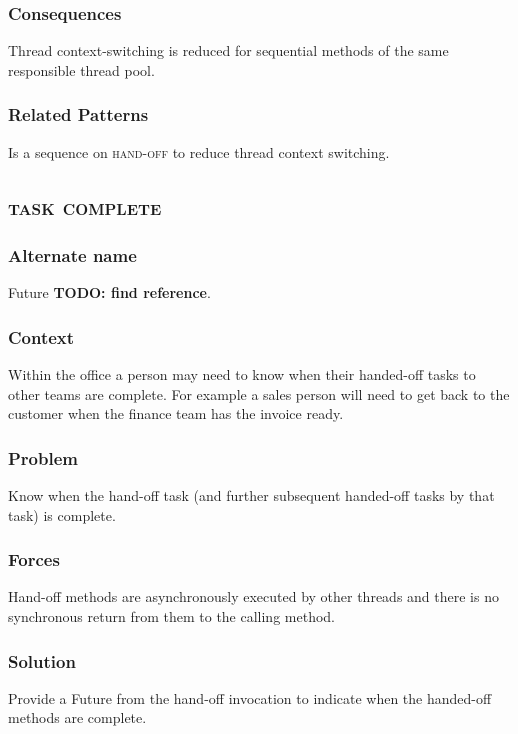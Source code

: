 \documentclass[prodmode]{style/acmlarge}
\begin{document}
\subsubsection*{Consequences} Thread context-switching is reduced for sequential
methods of the same responsible thread pool.

\subsubsection*{Related Patterns} Is a sequence on \textsc{hand-off} to reduce
thread context switching.



\subsection{\textsc{\textbf{task complete}}}

\subsubsection*{Alternate name} Future \textbf{TODO: find reference}.

\subsubsection*{Context} Within the office a person may need to know when their
handed-off tasks to other teams are complete.  For example a sales person will
need to get back to the customer when the finance team has the invoice ready.

\subsubsection*{Problem} Know when the hand-off task (and further subsequent
handed-off tasks by that task) is complete.

\subsubsection*{Forces} Hand-off methods are asynchronously executed by other
threads and there is no synchronous return from them to the calling method.

\subsubsection*{Solution} Provide a Future from the hand-off invocation to
indicate when the handed-off methods are complete.
\end{document}

